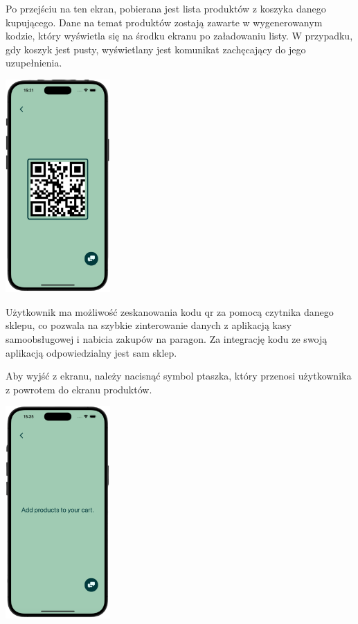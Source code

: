 Po przejściu na ten ekran, pobierana jest lista produktów z koszyka danego kupującego. Dane na temat produktów zostają zawarte w wygenerowanym kodzie, który wyświetla się na środku ekranu po załadowaniu listy. W przypadku, gdy koszyk jest pusty, wyświetlany jest komunikat zachęcający do jego uzupełnienia. 

\begin{center}
    \includegraphics[width=0.3\textwidth]{images/front/qr_page.png}
\end{center}

Użytkownik ma możliwość zeskanowania kodu qr za pomocą czytnika danego sklepu, co pozwala na szybkie zinterowanie danych z aplikacją kasy samoobsługowej i nabicia zakupów na paragon. Za integrację kodu ze swoją aplikacją odpowiedzialny jest sam sklep. 

Aby wyjść z ekranu, należy nacisnąć symbol ptaszka, który przenosi użytkownika z powrotem do ekranu produktów.

\begin{center}
    \includegraphics[width=0.3\textwidth]{images/front/qr_empty.png}
\end{center}

